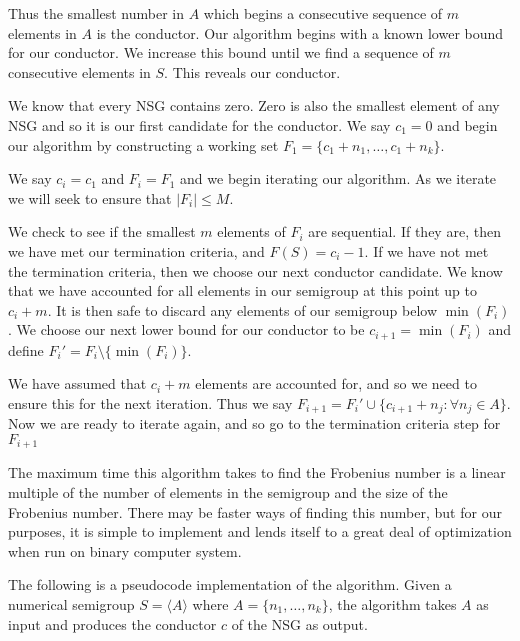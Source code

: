 \documentclass[11pt]{amsart}
\theoremstyle{plain}
\theoremstyle{definition}
\begin{document}
Thus the smallest number in $A$ which begins a consecutive sequence of $m$ elements in $A$ is the conductor.
Our algorithm begins with a known lower bound for our conductor.
We increase this bound until we find a sequence of $m$ consecutive elements in $S$. This reveals our conductor.

We know that every NSG contains zero.
Zero is also the smallest element of any NSG and so it is our first candidate for the conductor.
We say $c_1=0$ and begin our algorithm by constructing a working set $F_1=\{c_1+n_1,\dots, c_1+n_k\}$.

We say $c_i=c_1$ and $F_i=F_1$ and we begin iterating our algorithm.
As we iterate we will seek to ensure that $|F_i|\le M$.

We check to see if the smallest $m$ elements of $F_i$ are sequential.
If they are, then we have met our termination criteria, and $F(S)=c_i-1$.
If we have not met the termination criteria, then we choose our next conductor candidate.
We know that we have accounted for all elements in our semigroup at this point up to $c_i+m$.
It is then safe to discard any elements of our semigroup below $\min(F_i)$.
We choose our next lower bound for our conductor to be $c_{i+1}=\min(F_i)$ and define $F_i'=F_i\setminus\{\min(F_i)\}$.

We have assumed that $c_i+m$ elements are accounted for, and so we need to ensure this for the next iteration.
Thus we say $F_{i+1}=F_i'\cup \{c_{i+1}+n_j:\forall n_j\in A\}$. Now we are ready to iterate again, and so go to the termination criteria step for $F_{i+1}$

The maximum time this algorithm takes to find the Frobenius number is a linear
multiple of the number of elements in the semigroup and the size of the
Frobenius number. There may be faster ways of finding this number, but for our
purposes, it is simple to implement and lends itself to a great deal of optimization when run on binary computer system.\cite{frobmask}

The following is a pseudocode implementation of the algorithm. Given a numerical semigroup $S=\langle A\rangle$ where $A=\{n_1,\dots,n_k\}$, the algorithm takes $A$ as input and produces the conductor $c$ of the NSG as output.
\end{document}

